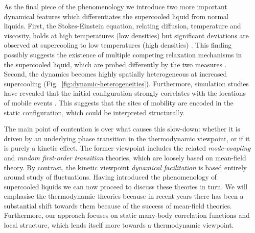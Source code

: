 \documentclass[11pt,twoside]{report}
\begin{document}
As the final piece of the phenomenology we introduce two more important dynamical features which differentiates the supercooled liquid from normal liquids.
First, the Stokes-Einstein equation, relating diffusion, temperature and viscosity, holds at high temperatures (low densities) but significant deviations are observed at supercooling to low temperatures (high densities) \cite{BerthierRMP2011}.
This finding possibly suggests the existence of multiple competing relaxation mechanisms in the supercooled liquid, which are probed differently by the two measures \cite{EdigerARPC2000}.
Second, the dynamics becomes highly spatially heterogeneous at increased supercooling (Fig.\ \ref{fig:dynamic-heterogeneities}).
Furthermore, simulation studies have revealed that the initial configuration strongly correlates with the locations of mobile events \cite{Widmer-CooperJPCM2005}.
This suggests that the sites of mobility are encoded in the static configuration, which could be interpreted structurally.


The main point of contention is over what causes this slow-down: whether it is driven by an underlying phase transition in the thermodynamic viewpoint, or if it is purely a kinetic effect.
The former viewpoint includes the related \emph{mode-coupling} and \emph{random first-order transition} theories, which are loosely based on mean-field theory.
By contrast, the kinetic viewpoint \emph{dynamical facilitation} is based entirely around study of fluctuations.
Having introduced the phenomenology of supercooled liquids we can now proceed to discuss these theories in turn.
We will emphasise the thermodynamic theories because in recent years there has been a substantial shift towards them because of the success of mean-field theories.
Furthermore, our approach focuses on static many-body correlation functions and local structure, which lends itself more towards a thermodynamic viewpoint.
\end{document}
